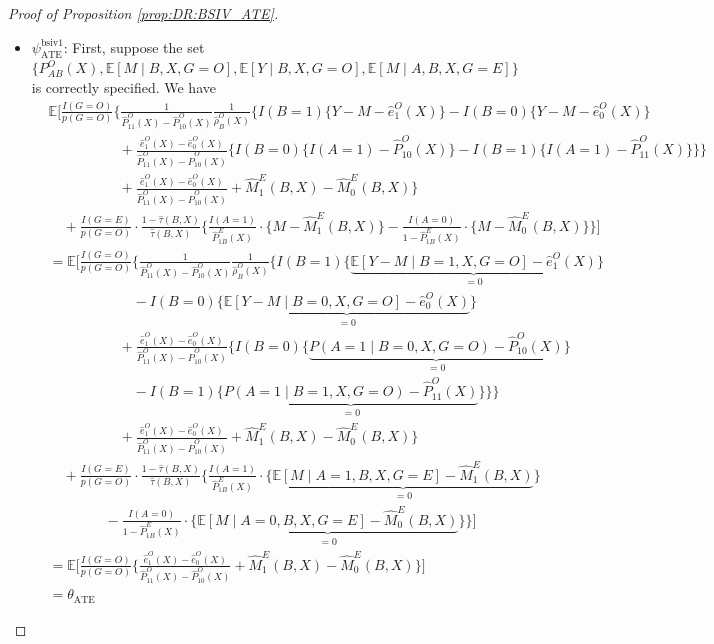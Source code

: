 \documentclass[10pt]{article}
\newcommand{\E}{\mathbb{E}}
\begin{document}
\begin{proof}[Proof of Proposition \ref{prop:DR:BSIV_ATE}]


\begin{itemize}
    \item $\psi_{\text{ATE}}^{\text{bsiv1}}$:
    First, suppose the set $\{P_{AB}^O(X),\mathbb{E}[M\mid B,X,G=O],\mathbb{E}[Y\mid B,X,G=O],\mathbb{E}[M\mid A,B,X,G=E]\}$ is correctly specified. We have
\begingroup
\allowdisplaybreaks
{\footnotesize \begin{align*}
&\E\Big[\frac{I(G=O)}{p(G=O)}\Bigg\{\frac{1}{\hat{P}_{11}^O(X)-\hat{P}_{10}^O(X)}
\frac{1}{\hat{\rho}_B^O(X)}\bigg\{I(B=1)\{Y-M-\hat{e}_1^O(X)\}
-I(B=0)\{Y-M-\hat{e}_0^O(X)\}\\
&\quad\quad\quad\quad\quad+\frac{\hat{e}_1^O(X)-\hat{e}_0^O(X)}{\hat{P}_{11}^O(X)-\hat{P}_{10}^O(X)}\big\{I(B=0)\{I(A=1)-\hat{P}_{10}^O(X)\}-I(B=1)\{I(A=1)-\hat{P}_{11}^O(X)\}\big\}\bigg\}\\
&\quad\quad\quad\quad\quad+\frac{\hat{e}_1^O(X)-\hat{e}_0^O(X)}{\hat{P}_{11}^O(X)-\hat{P}_{10}^O(X)}+\hat{M}_{1}^{E}(B,X)-\hat{M}_{0}^{E}(B,X)\Bigg\}\\
&\quad+\frac{I(G=E)}{p(G=O)}\cdot\frac{1-\hat{\tau}(B,X)}{\hat{\tau}(B,X)}\bigg\{\frac{I(A=1)}{\hat{P}_{1B}^E(X)}\cdot\{M-\hat{M}_{1}^{E}(B,X)\}-\frac{I(A=0)}{1-\hat{P}_{1B}^E(X)}\cdot\{M-\hat{M}_{0}^{E}(B,X)\}\bigg\}\Big]\\
&=\E\Big[\frac{I(G=O)}{p(G=O)}\Bigg\{\frac{1}{\hat{P}_{11}^O(X)-\hat{P}_{10}^O(X)}
\frac{1}{\hat{\rho}_B^O(X)}\bigg\{I(B=1)\{\underbrace{\E[Y-M\mid B=1,X,G=O]-\hat{e}_1^O(X)}_{=0}\}\\
&\quad\quad\quad\quad\quad\quad
-I(B=0)\{\underbrace{\E[Y-M\mid B=0,X,G=O]-\hat{e}_0^O(X)}_{=0}\}\\
&\quad\quad\quad\quad\quad+\frac{\hat{e}_1^O(X)-\hat{e}_0^O(X)}{\hat{P}_{11}^O(X)-\hat{P}_{10}^O(X)}\big\{I(B=0)\{\underbrace{P(A=1\mid B=0,X,G=O)-\hat{P}_{10}^O(X)}_{=0}\}\\
&\quad\quad\quad\quad\quad\quad-I(B=1)\{\underbrace{P(A=1\mid B=1,X,G=O)-\hat{P}_{11}^O(X)}_{=0}\}\big\}\bigg\}\\
&\quad\quad\quad\quad\quad+\frac{\hat{e}_1^O(X)-\hat{e}_0^O(X)}{\hat{P}_{11}^O(X)-\hat{P}_{10}^O(X)}+\hat{M}_{1}^{E}(B,X)-\hat{M}_{0}^{E}(B,X)\Bigg\}\\
&\quad+\frac{I(G=E)}{p(G=O)}\cdot\frac{1-\hat{\tau}(B,X)}{\hat{\tau}(B,X)}\bigg\{\frac{I(A=1)}{\hat{P}_{1B}^E(X)}\cdot\{\underbrace{\E[M\mid A=1,B,X,G=E]-\hat{M}_{1}^{E}(B,X)}_{=0}\}\\
&\quad\quad\quad\quad-\frac{I(A=0)}{1-\hat{P}_{1B}^E(X)}\cdot\{\underbrace{\E[M\mid A=0,B,X,G=E]-\hat{M}_{0}^{E}(B,X)}_{=0}\}\bigg\}\Big]\\
&=\E\Big[\frac{I(G=O)}{p(G=O)}\Bigg\{\frac{\hat{e}_1^O(X)-\hat{e}_0^O(X)}{\hat{P}_{11}^O(X)-\hat{P}_{10}^O(X)}+\hat{M}_{1}^{E}(B,X)-\hat{M}_{0}^{E}(B,X)\Bigg\}\Big]\\
&=\theta_{\text{ATE}}
\end{align*}}
\endgroup


\end{itemize}
\end{proof}
\end{document}
